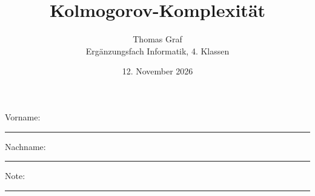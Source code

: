 \newtoggle{withbonus} \togglefalse{withbonus}

\newcommand{\mycourse}{Ergänzungsfach Informatik}
\newcommand{\myclass}{4. Klassen}
\newcommand{\mydate}{12. November 2026}

\title{\textbf{Kolmogorov-Komplexität}}
\author{Thomas Graf\\
	\mycourse, \myclass}
\date{\mydate}
\maketitle
\thispagestyle{headandfoot}

\begin{center}
\end{center}
\vspace{10mm}

\begin{center}
	Vorname: \rule{45mm}{0.8pt}\qquad Nachname: \rule{45mm}{0.8pt}
\end{center}
\vspace{20mm}

\begin{center}
	\iftoggle{withbonus}{
		\combinedgradetable[h][questions]
	}{
		\gradetable[h][questions]
	}
\end{center}
\vspace{15mm}
\begin{center}
	Note:
	\vspace{10mm}

	\rule{8mm}{1.2pt}
\end{center}
\clearpage

